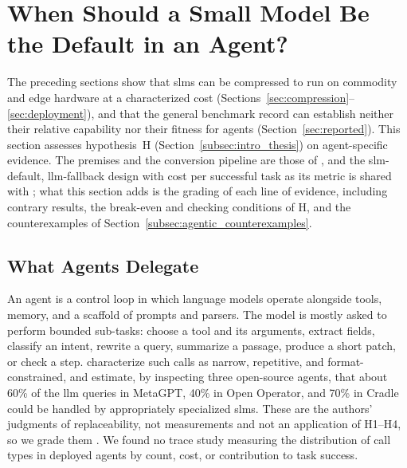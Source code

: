 
\section{When Should a Small Model Be the Default in an Agent?}
\label{sec:agentic}

The preceding sections show that \glspl{slm} can be compressed to run on commodity and edge hardware at a characterized cost (Sections~\ref{sec:compression}--\ref{sec:deployment}), and that the general benchmark record can establish neither their relative capability nor their fitness for agents (Section~\ref{sec:reported}). This section assesses hypothesis~H (Section~\ref{subsec:intro_thesis}) on agent-specific evidence. The premises and the conversion pipeline are those of \citet{belcak2025slm_agentic}, and the \gls{slm}-default, \gls{llm}-fallback design with cost per successful task as its metric is shared with \citet{sharma2025slm_agentic}; what this section adds is the grading of each line of evidence, including contrary results, the break-even and checking conditions of H, and the counterexamples of Section~\ref{subsec:agentic_counterexamples}.

\subsection{What Agents Delegate}
\label{subsec:agentic_delegation}

An agent is a control loop in which language models operate alongside tools, memory, and a scaffold of prompts and parsers. The model is mostly asked to perform bounded sub-tasks: choose a tool and its arguments, extract fields, classify an intent, rewrite a query, summarize a passage, produce a short patch, or check a step. \citet{belcak2025slm_agentic} characterize such calls as narrow, repetitive, and format-constrained, and estimate, by inspecting three open-source agents, that about 60\% of the \gls{llm} queries in MetaGPT, 40\% in Open Operator, and 70\% in Cradle could be handled by appropriately specialized \glspl{slm}. These are the authors' judgments of replaceability, not measurements and not an application of H1--H4, so we grade them \evD{}. We found no trace study measuring the distribution of call types in deployed agents by count, cost, or contribution to task success.

